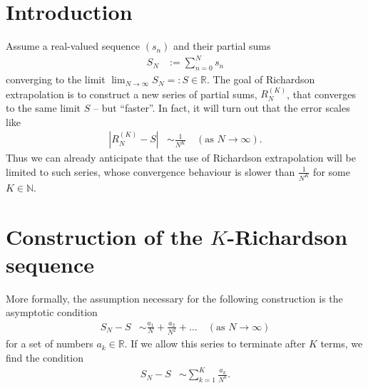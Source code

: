 \documentclass[english, parskip=full]{scrartcl}
\title{\titel}
\author{\autor}
\date{\today}
\newcommand{\tecxt}{}
\begin{document}
\maketitle  %

\section{Introduction}
Assume a real-valued sequence $(s_n)$ and their partial sums
\begin{align}
S_N &:= \sum_{n=0}^{N} s_n
\end{align}
converging to the limit $\lim_{N\rightarrow \infty} S_N =: S \in\mathbb{R}$.
The goal of Richardson extrapolation is to construct a new series of partial sums, $R_N^{(K)}$, that converges to the same limit $S$ -- but ``faster''.
In fact, it will turn out that the error scales like
\begin{align}
|R_N^{(K)} - S| &\sim  \frac{1}{N^K} \quad (\tecxt\text{as } N \rightarrow\infty) .
\end{align}
Thus we can already anticipate that the use of Richardson extrapolation will be limited to such series, whose convergence behaviour is slower than $\frac{1}{N^K}$ for some $K\in\mathbb{N}$.

\section{Construction of the $K$-Richardson sequence}
More formally, the assumption necessary for the following construction is the asymptotic condition
\begin{align}
S_N - S &\sim \frac{a_1}{N} + \frac{a_2}{N^2} + \dots  \quad (\tecxt\text{as } N \rightarrow\infty)
\end{align}
for a set of numbers $a_k\in\mathbb{R}$.
If we allow this series to terminate after $K$ terms, we find the condition
\begin{align}
S_N - S &\sim \sum_{k=1}^K \frac{a_k}{N^k}.
\end{align}
\end{document}
